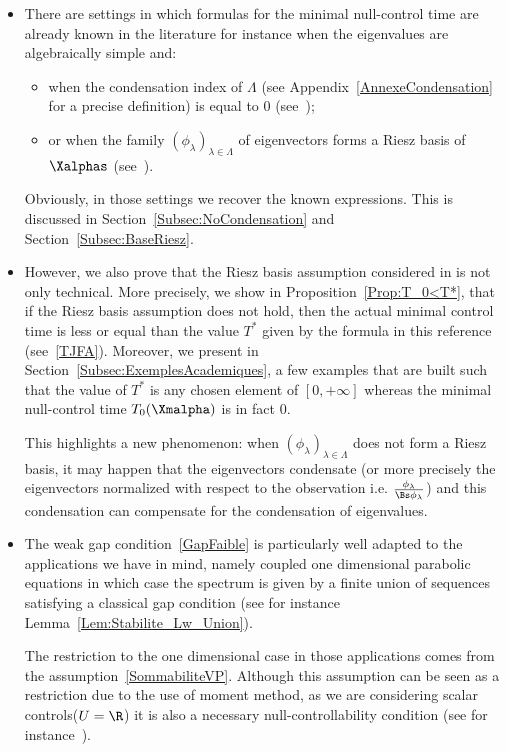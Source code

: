 \begin{itemize}
\item There are settings in which formulas for the minimal null-control time are already known in the literature for instance when the eigenvalues are algebraically simple and:
\begin{itemize}
\item when the condensation index of $\Lambda$ (see Appendix~\ref{AnnexeCondensation} for a precise definition) is equal to $0$ (see~\cite[Remark~1.15]{AKBGBM_2018});
\item or when the family $(\phi_\lambda)_{\lambda\in \Lambda}$ of eigenvectors forms a Riesz basis of $\Xalphas$ (see~\cite{AmmarKhodjaBenabdallahGonzalez-BurgosdeTeresa:2014}).
\end{itemize}
Obviously, in those settings we recover the known expressions. This is discussed in Section~\ref{Subsec:NoCondensation} and Section~\ref{Subsec:BaseRiesz}.
\item However, we also prove that the Riesz basis assumption considered in\linebreak \cite{AmmarKhodjaBenabdallahGonzalez-BurgosdeTeresa:2014} is not only technical. More precisely, we show in Proposition~\ref{Prop:T_0<T*}, that if the Riesz basis assumption does not hold, then the actual minimal control time is less or equal than the value $T^*$ given by the formula in this reference (see~\eqref{TJFA}). Moreover, we present in Section~\ref{Subsec:ExemplesAcademiques}, a few examples that are built such that the value of $T^*$ is any chosen element of $[0, +\infty]$ whereas the minimal null-control time $T_0(\Xmalpha)$ is in fact $0$.

This highlights a new phenomenon: when $(\phi_\lambda)_{\lambda\in \Lambda}$ does not form a Riesz basis, it may happen that the eigenvectors condensate (or more precisely the eigenvectors normalized with respect to the observation i.e. $\frac{\phi_\lambda}{\Bs \phi_\lambda}$) and this condensation can compensate for the condensation of eigenvalues.
\item The weak gap condition~\eqref{GapFaible} is particularly well adapted to the applications we have in mind, namely coupled one dimensional parabolic equations in which case the spectrum is given by a finite union of sequences satisfying a classical gap condition (see for instance Lemma~\ref{Lem:Stabilite_Lw_Union}).

The restriction to the one dimensional case in those applications comes from the assumption~\eqref{SommabiliteVP}. Although this assumption can be seen as a restriction due to the use of moment method, as we are considering scalar controls\linebreak($U=\R$) it is also a necessary null-controllability condition (see for instance~\cite[Appendix A]{Miller06}).


\end{itemize}
